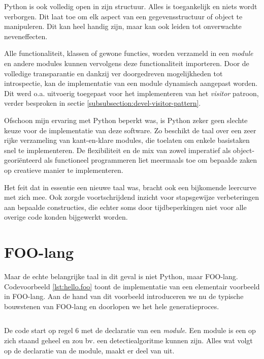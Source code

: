 Python is ook volledig open in zijn structuur. Alles is toegankelijk en niets
wordt verborgen. Dit laat toe om elk aspect van een gegevensstructuur of object
te manipuleren. Dit kan heel handig zijn, maar kan ook leiden tot onverwachte
neveneffecten.

Alle functionaliteit, klassen of gewone functies, worden verzameld in een
\emph{module} en andere modules kunnen vervolgens deze functionaliteit
importeren. Door de volledige transparantie en dankzij ver doorgedreven
mogelijkheden tot introspectie, kan de implementatie van een module dynamisch
aangepast worden. Dit werd o.a. uitvoerig toegepast voor het implementeren van
het \emph{visitor} patroon, verder besproken in sectie
\ref{subsubsection:devel-visitor-pattern}.

Ofschoon mijn ervaring met Python beperkt was, is Python zeker geen slechte
keuze voor de implementatie van deze software. Zo beschikt de taal over een
zeer rijke verzameling van kant-en-klare modules, die toelaten om enkele
basistaken snel te implementeren. De flexibiliteit en de mix van zowel
imperatief als object-geori\"enteerd als functioneel programmeren liet
meermaals toe om bepaalde zaken op creatieve manier te implementeren.

Het feit dat in essentie een nieuwe taal was, bracht ook een bijkomende
leercurve met zich mee. Ook zorgde voortschrijdend inzicht voor stapsgewijze
verbeteringen aan bepaalde constructies, die echter soms door tijdbeperkingen
niet voor alle overige code konden bijgewerkt worden.

\section{FOO-lang}
\label{section:devel-foo-lang}

Maar de echte belangrijke taal in dit geval is niet Python, maar FOO-lang.
Codevoorbeeld \ref{lst:hello.foo} toont de implementatie van een elementair voorbeeld
in FOO-lang. Aan de hand van dit voorbeeld introduceren we nu de typische
bouwstenen van FOO-lang en doorlopen we het hele generatieproces.

\inputminted[linenos,frame=lines,framesep=2mm,fontsize=\footnotesize]{js}{../src/foo-lang/examples/hello.foo}
\vspace{-5mm}
\vspace{3mm}

De code start op regel 6 met de declaratie van een \emph{module}. Een module is
een op zich staand geheel en zou bv. een detectiealgoritme kunnen zijn. Alles
wat volgt op de declaratie van de module, maakt er deel van uit.


